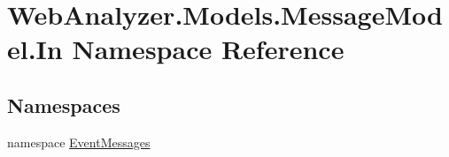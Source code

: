 \hypertarget{namespace_web_analyzer_1_1_models_1_1_message_model_1_1_in}{}\section{Web\+Analyzer.\+Models.\+Message\+Model.\+In Namespace Reference}
\label{namespace_web_analyzer_1_1_models_1_1_message_model_1_1_in}
\subsection*{Namespaces}
\begin{DoxyCompactItemize}
\item 
namespace \hyperlink{namespace_web_analyzer_1_1_models_1_1_message_model_1_1_in_1_1_event_messages}{Event\+Messages}
\end{DoxyCompactItemize}

